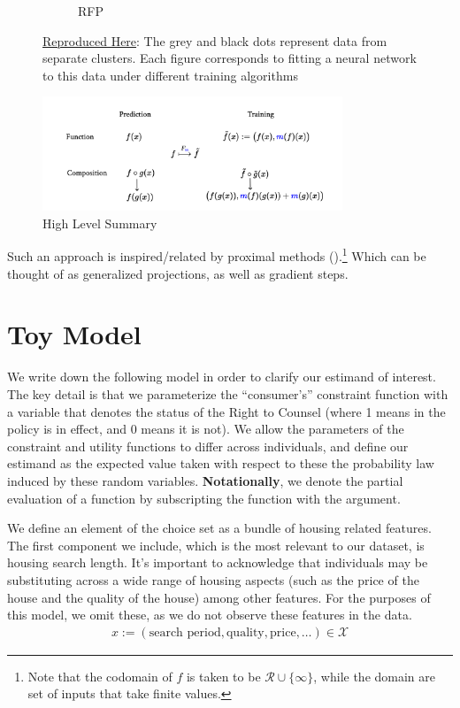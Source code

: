 \documentclass[a4paper,12pt]{article}
\begin{document}
\begin{figure}[htbp]
\begin{subfigure}{.32\textwidth}
        \caption{RFP}
    \label{fig:rfp}
\end{subfigure}
\caption{ \href{https://github.com/pharringtonp19/rfp/blob/main/notebooks/grad_desc_toy.ipynb}{Reproduced Here}: The grey and black dots represent data from separate clusters. Each figure corresponds to fitting a neural network to this data under different training algorithms}
\label{fig:mamlablation}
\end{figure}

\begin{figure}[htbp]
\centering
\includegraphics[width=0.8\textwidth]{figures/framework/cat.png}
        \caption{High Level Summary}
        \label{fig:hls}
\end{figure}

Such an approach is inspired/related by proximal methods (\cite{parikh2014proximal}).\footnote{Note that the codomain of $f$ is taken to be $\mathcal{R} \cup \{ \infty\}$, while the domain are set of inputs that take finite values.} Which can be thought of as generalized projections, as well as gradient steps. 


 


\section{Toy Model}
We write down the following model in order to clarify our estimand of interest. The key detail is that we parameterize the ``consumer's'' constraint function with a variable that denotes the status of the Right to Counsel (where 1 means in the policy is in effect, and 0 means it is not). We allow the parameters of the constraint and utility functions to differ across individuals, and define our estimand as the expected value taken with respect to these the probability law induced by these random variables. \textbf{Notationally}, we denote the partial evaluation of a function by subscripting the function with the argument.\par 
We define an element of the choice set as a bundle of housing related features. The first component we include, which is the most relevant to our dataset, is housing search length. It's important to acknowledge that individuals may be substituting across a wide range of housing aspects (such as the price of the house and the quality of the house) among other features. For the purposes of this model, we omit these, as we do not observe these features in the data. 
\begin{align*}
    x := (\textrm{search period}, \textrm{quality}, \textrm{price}, \dots ) \in \mathcal{X}
\end{align*}
\end{document}
